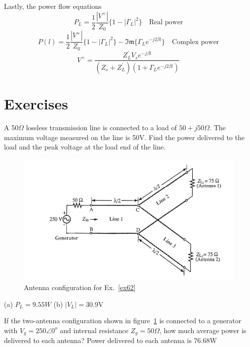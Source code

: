 Lastly, the power flow equations
\begin{dmath*}
P_L = \frac{1}{2}\frac{|V^+|}{Z_0}\lbrace 1 - |\Gamma_L|^2\rbrace\quad\text{Real power}
\end{dmath*}
\begin{dmath*}
P(l) = \frac{1}{2}\frac{|V^+|}{Z_0}\lbrace 1 - |\Gamma_L|^2\rbrace - \mathfrak{Im}\lbrace \Gamma_L e^{- j2\beta l}\rbrace\quad\text{Complex power}
\end{dmath*}
\[
V^+ = \frac{Z_L^{'}V_s e^{-j\beta l}}{(Z_s + Z_L^{'})(1 + \Gamma_L e^{-j2\beta l})}
\]

\section*{Exercises}
\begin{ExerciseList}
\Exercise[label={ex61}]
A 50$\Omega$ lossless transmission line is connected to a load of $50 + j50\Omega$. The maximum voltage measured on the line is 50V. Find the power delivered to the load and the peak voltage at the load end of the line.
\begin{figure}[h]
\centering
\includegraphics[width=1\linewidth]{./graphics/antenna_power_problem}
\caption{Antenna configuration for Ex.~\ref{ex62}}
\label{fig:antennapowerproblem}
\end{figure}
\Answer[ref={ex61}]
(a) $P_L = 9.55W$ (b) $|V_L| = 30.9$V

\Exercise[label={ex62}]
If the two-antenna configuration shown in figure~\ref{fig:antennapowerproblem} is connected to a generator with $V_g = 250\angle0^o$ and internal resistance $Z_g = 50\varOmega$, how much average power is delivered to each antenna?
\Answer[ref={ex62}]
Power delivered to each antenna is 76.68W
\end{ExerciseList}